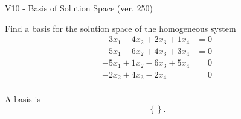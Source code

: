 \begin{exercise}
  \begin{exerciseTitle}V10 - Basis of Solution Space (ver. 250)\end{exerciseTitle}
  \begin{exerciseStatement}
    Find a basis for the solution space of the homogeneous system 
\begin{align*}
 -3 x_ 1 -4 x_ 2 + 2 x_ 3 + 1 x_ 4 &= 0  \\ 
  -5 x_ 1 -6 x_ 2 + 4 x_ 3 + 3 x_ 4 &= 0  \\ 
  -5 x_ 1 + 1 x_ 2 -6 x_ 3 + 5 x_ 4 &= 0  \\ 
  -2 x_ 2 + 4 x_ 3 -2 x_ 4 &= 0  \\ 
 \end{align*}


 
  \end{exerciseStatement}

  \begin{exerciseAnswer}
   A basis is   
\[\left\{\right\}.\]

  


  \end{exerciseAnswer}
\end{exercise}